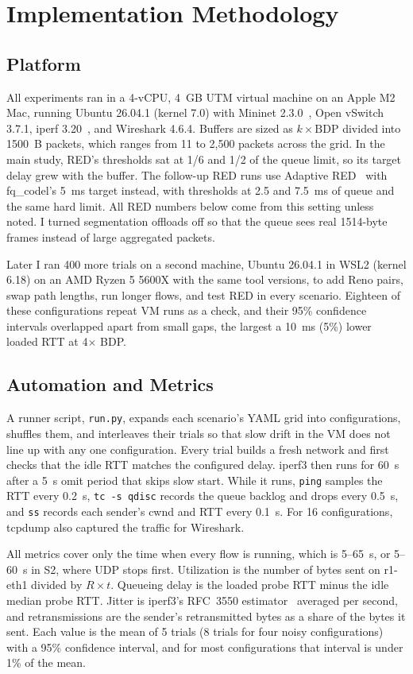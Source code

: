 \documentclass[conference,12pt,letterpaper]{IEEEtran}
\newcommand{\x}{\ensuremath{\times}}
\begin{document}
\section{Implementation Methodology}

\subsection{Platform}
All experiments ran in a 4-vCPU, 4~GB UTM virtual machine on an Apple M2 Mac, running Ubuntu 26.04.1 (kernel 7.0) with Mininet 2.3.0~\cite{mininet}, Open vSwitch 3.7.1, iperf 3.20~\cite{iperf3}, and Wireshark 4.6.4. Buffers are sized as $k \times \mathrm{BDP}$ divided into 1500~B packets, which ranges from 11 to 2,500 packets across the grid. In the main study, RED's thresholds sat at 1/6 and 1/2 of the queue limit, so its target delay grew with the buffer. The follow-up RED runs use Adaptive RED~\cite{ared} with fq\_codel's 5~ms target instead, with thresholds at 2.5 and 7.5~ms of queue and the same hard limit. All RED numbers below come from this setting unless noted. I turned segmentation offloads off so that the queue sees real 1514-byte frames instead of large aggregated packets.

Later I ran 400 more trials on a second machine, Ubuntu 26.04.1 in WSL2 (kernel 6.18) on an AMD Ryzen 5 5600X with the same tool versions, to add Reno pairs, swap path lengths, run longer flows, and test RED in every scenario. Eighteen of these configurations repeat VM runs as a check, and their 95\% confidence intervals overlapped apart from small gaps, the largest a 10~ms (5\%) lower loaded RTT at 4\x{} BDP.

\subsection{Automation and Metrics}
A runner script, \texttt{run.py}, expands each scenario's YAML grid into configurations, shuffles them, and interleaves their trials so that slow drift in the VM does not line up with any one configuration. Every trial builds a fresh network and first checks that the idle RTT matches the configured delay. iperf3 then runs for 60~s after a 5~s omit period that skips slow start. While it runs, \texttt{ping} samples the RTT every 0.2~s, \texttt{tc -s qdisc} records the queue backlog and drops every 0.5~s, and \texttt{ss} records each sender's cwnd and RTT every 0.1~s. For 16 configurations, tcpdump also captured the traffic for Wireshark.

All metrics cover only the time when every flow is running, which is 5--65~s, or 5--60~s in S2, where UDP stops first. Utilization is the number of bytes sent on r1-eth1 divided by $R \times t$. Queueing delay is the loaded probe RTT minus the idle median probe RTT. Jitter is iperf3's RFC~3550 estimator~\cite{rfc3550} averaged per second, and retransmissions are the sender's retransmitted bytes as a share of the bytes it sent. Each value is the mean of 5 trials (8 trials for four noisy configurations) with a 95\% confidence interval, and for most configurations that interval is under 1\% of the mean.
\end{document}
